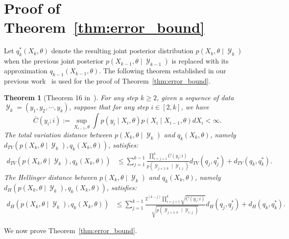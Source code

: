 \documentclass[preprint,3p,times]{elsarticle}
\DeclareMathOperator{\Y}{\mathcal{Y}}
\newcommand{\pdense}{p}
\newtheorem{theorem}{Theorem}
\begin{document}
\section{Proof of Theorem~\ref{thm:error_bound}}
\label{app:proof_thm}
Let $q_k^*(X_k,\theta)$ denote the resulting joint posterior distribution $\pdense(X_k,\theta \mid \Y_k)$ when the previous joint posterior $\pdense(X_{k-1},\theta \mid \Y_{k-1})$ is replaced with its approximation $q_{k-1}(X_{k-1},\theta)$. The following theorem established in our previous work~\cite{wang_gorodetsky_2025_lipschitz_stability} is used for the proof of Theorem~\ref{thm:error_bound}.
\begin{theorem}[Theorem 16 in~\cite{wang_gorodetsky_2025_lipschitz_stability}]
\label{thm:learning_bound}
For any step $k \geq 2$, given a sequence of data $\Y_k=(y_1,y_2,\cdots,y_k)$, suppose that for any step $i \in [2,k]$, we have
\begin{equation}
\bar{C}(y_i;i) := \sup_{X_{i-1},\theta}\int p(y_i \mid X_i,\theta)p(X_i \mid X_{i-1},\theta)dX_i < \infty.
\label{ieq:assumption}
\end{equation}
The total variation distance between $p(X_k,\theta \mid \Y_k)$ and $q_k(X_k,\theta)$, namely $d_{TV}\left(p(X_k,\theta \mid \Y_k), q_k(X_k,\theta)\right)$, satisfies:
\begin{align}
d_{TV}\left(p(X_k,\theta \mid \Y_k), q_k(X_k,\theta)\right) &\leq \sum_{j=1}^{k-1}\frac{\prod_{i=j+1}^k\bar{C}(y_i;i)}{p(\Y_{j+1:k}\mid \Y_{1:j})}d_{TV}\left(q_j, q_j^*\right) + d_{TV}\left(q_k, q_k^*\right).
\end{align}
The Hellinger distance between $p(X_k,\theta \mid \Y_k)$ and $q_k(X_k,\theta)$, namely $d_{H}(p(X_k,\theta \mid \Y_k), q_k(X_k,\theta))$, satisfies:
\begin{align}
d_{H}(p(X_k,\theta \mid \Y_k), q_k(X_k,\theta)) &\leq \sum_{j=1}^{k-1}\frac{2^{(k-j)}\prod_{i=j+1}^k\sqrt{\bar{C}(y_i;i)}}{\sqrt{p(\Y_{j+1:k}\mid \Y_{1:j})}}d_{H}\left(q_j, q_j^*\right) + d_{H}\left(q_k, q_k^*\right).
\end{align}

\end{theorem}
We now prove Theorem~\ref{thm:error_bound}.
\end{document}
